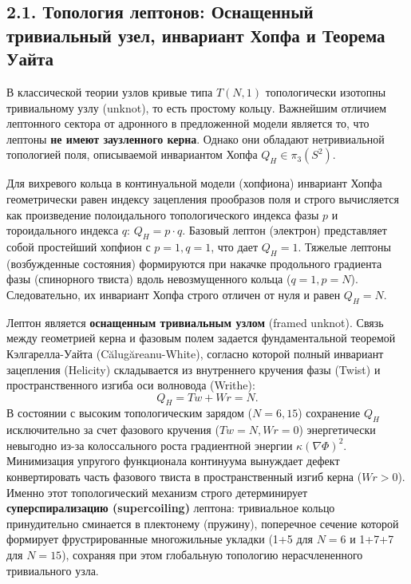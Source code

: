 \documentclass[11pt,a4paper]{article}
\begin{document}
	\subsection{2.1. Топология лептонов: Оснащенный тривиальный узел, инвариант Хопфа и Теорема Уайта}
	В классической теории узлов кривые типа $T(N,1)$ топологически изотопны тривиальному узлу (unknot), то есть простому кольцу. Важнейшим отличием лептонного сектора от адронного в предложенной модели является то, что лептоны \textbf{не имеют заузленного керна}. Однако они обладают нетривиальной топологией поля, описываемой инвариантом Хопфа $Q_H \in \pi_3(S^2)$.
	
	Для вихревого кольца в континуальной модели (хопфиона) инвариант Хопфа геометрически равен индексу зацепления прообразов поля и строго вычисляется как произведение полоидального топологического индекса фазы $p$ и тороидального индекса $q$: $Q_H = p \cdot q$.
	Базовый лептон (электрон) представляет собой простейший хопфион с $p=1, q=1$, что дает $Q_H = 1$. Тяжелые лептоны (возбужденные состояния) формируются при накачке продольного градиента фазы (спинорного твиста) вдоль невозмущенного кольца ($q=1, p=N$). Следовательно, их инвариант Хопфа строго отличен от нуля и равен $Q_H = N$.
	
	Лептон является \textbf{оснащенным тривиальным узлом} (framed unknot). Связь между геометрией керна и фазовым полем задается фундаментальной теоремой Кэлгарелла-Уайта (Călugăreanu-White), согласно которой полный инвариант зацепления (Helicity) складывается из внутреннего кручения фазы (Twist) и пространственного изгиба оси волновода (Writhe):
	\begin{equation}
		Q_H = Tw + Wr = N.
	\end{equation}
	В состоянии с высоким топологическим зарядом ($N=6, 15$) сохранение $Q_H$ исключительно за счет фазового кручения ($Tw=N, Wr=0$) энергетически невыгодно из-за колоссального роста градиентной энергии $\kappa (\nabla \Phi)^2$. Минимизация упругого функционала континуума вынуждает дефект конвертировать часть фазового твиста в пространственный изгиб керна ($Wr > 0$).
	Именно этот топологический механизм строго детерминирует \textbf{суперспирализацию (supercoiling)} лептона: тривиальное кольцо принудительно сминается в плектонему (пружину), поперечное сечение которой формирует фрустрированные многожильные укладки (1+5 для $N=6$ и 1+7+7 для $N=15$), сохраняя при этом глобальную топологию нерасчлененного тривиального узла.
	
\end{document}
